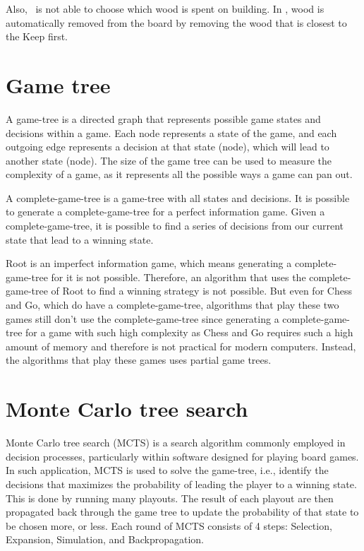 Also, \Marquise \ is not able to choose which wood is spent on building. In \RootV, wood is automatically removed from the board by removing the wood that is closest to the Keep first. 

\section{Game tree}
A \gls{game-tree} is a directed graph that represents possible game states and decisions within a game. Each node represents a state of the game, and each outgoing edge represents a decision at that state (node), which will lead to another state (node). The size of the game tree can be used to measure the complexity of a game, as it represents all the possible ways a game can pan out.

A \gls{complete-game-tree} is a \gls{game-tree} with all states and decisions. It is possible to generate a \gls{complete-game-tree} for a perfect information game. Given a \gls{complete-game-tree}, it is possible to find a series of decisions from our current state that lead to a winning state.

Root is an imperfect information game, which means generating a \gls{complete-game-tree} for it is not possible. Therefore, an algorithm that uses the \gls{complete-game-tree} of Root to find a winning strategy is not possible. But even for Chess and Go, which do have a \gls{complete-game-tree}, algorithms that play these two games still don't use the \gls{complete-game-tree} since generating a \gls{complete-game-tree} for a game with such high complexity as Chess and Go requires such a high amount of memory and therefore is not practical for modern computers. Instead, the algorithms that play these games uses partial game trees.


\section{Monte Carlo tree search}
Monte Carlo tree search (MCTS) is a search algorithm commonly employed in decision processes, particularly within software designed for playing board games. In such application, MCTS is used to solve the \gls{game-tree}, i.e., identify the decisions that maximizes the probability of leading the player to a winning state. This is done by running many \glspl{playout}. The result of each \gls{playout} are then propagated back through the game tree to update the probability of that state to be chosen more, or less. Each round of MCTS consists of 4 steps: Selection, Expansion, Simulation, and Backpropagation.

